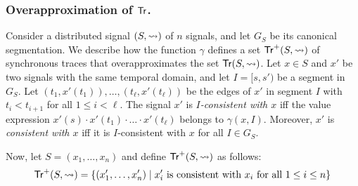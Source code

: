 \subsubsection{Overapproximation of $\mathsf{Tr}$.}
Consider a distributed signal $(S,{\rightsquigarrow})$ of $n$ signals, and let $G_S$ be its canonical segmentation.
We describe how the function $\gamma$ defines a set $\mathsf{Tr}^+(S,{\rightsquigarrow})$ of synchronous traces that overapproximates the set $\mathsf{Tr}(S,{\rightsquigarrow})$.
%
%
%
Let $x \in S$ and $x'$ be two signals with the same temporal domain, and let $I = [s, s')$ be a segment in $G_S$.
Let $(t_1, x'(t_1)), \ldots, (t_\ell, x'(t_\ell))$ be the edges of $x'$ in segment $I$ with $t_i < t_{i+1}$ for all $1 \leq i < \ell$.
The signal $x'$ is \emph{$I$-consistent with $x$} iff the value expression $x'(s) \cdot x'(t_1) \cdot \ldots \cdot x'(t_\ell)$ belongs to $\gamma(x,I)$.
Moreover, $x'$ is \emph{consistent with $x$} iff it is $I$-consistent with $x$ for all $I \in G_S$.

Now, let $S = (x_1, \ldots, x_n)$ and define $\mathsf{Tr}^+(S,{\rightsquigarrow})$ as follows:
\vspace{-0.5em}
\[ \tr^+(S,{\hb}) = \{ (x_1', \ldots, x_n') \st \text{$x_i'$ is consistent with $x_i$ for all $1 \leq i \leq n$}\} \]



